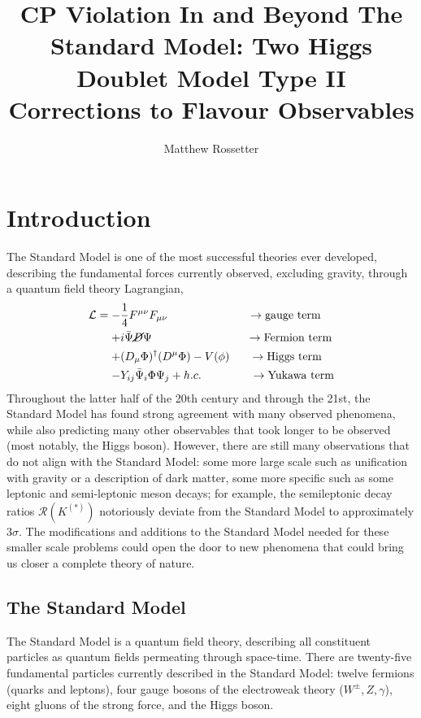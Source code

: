 \documentclass[a4paper,12pt]{article}
\title{CP Violation In and Beyond The Standard Model: Two Higgs Doublet Model Type II Corrections to Flavour Observables}
\author{Matthew Rossetter}
\affiliation{Supervised By Alexander Lenz}
\affiliation{MPhys Theoretical Physics, Durham University}
\begin{document}
 
\maketitle

\section{Introduction}
The Standard Model is one of the most successful theories ever developed, describing the fundamental forces currently observed, excluding gravity, through a quantum field theory Lagrangian, 
\begin{equation}
    \label{eq:sm}
    \begin{split}
        \mathcal{L} = -&\frac14 F^{\mu\nu}F_{\mu\nu} \qquad\qquad\qquad\quad\to \text{gauge term}\\
                      +& i\bar{\Psi}\cancel{D}\Psi \qquad\qquad\qquad\qquad\;\to \text{Fermion term} \\
                      +& (D_\mu\Phi)^\dagger(D^\mu\Phi) - V(\phi) \quad\;\;\,\to \text{Higgs term}\\
                      -& Y_{ij}\bar{\Psi}_i\Phi\Psi_j + h.c. \qquad\qquad\;\to\text{Yukawa term}
    \end{split}
\end{equation}
Throughout the latter half of the 20th century and through the 21st, the Standard Model has found strong agreement with many observed phenomena, while also predicting many other observables that took longer to be observed (most notably, the Higgs boson).
However, there are still many observations that do not align with the Standard Model: some more large scale such as unification with gravity or a description of dark matter, some more specific such as some leptonic and semi-leptonic meson decays; for example, the semileptonic decay ratios $\mathcal{R}(K^{(*)})$ notoriously deviate from the Standard Model to approximately $3\sigma$.
The modifications and additions to the Standard Model needed for these smaller scale problems could open the door to new phenomena that could bring us closer a complete theory of nature. 

\subsection{The Standard Model}
The Standard Model is a quantum field theory, describing all constituent particles as quantum fields permeating through space-time. 
There are twenty-five fundamental particles currently described in the Standard Model: twelve fermions (quarks and leptons), four gauge bosons of the electroweak theory ($W^\pm,Z,\gamma$), eight gluons of the strong force, and the Higgs boson.
\end{document}
